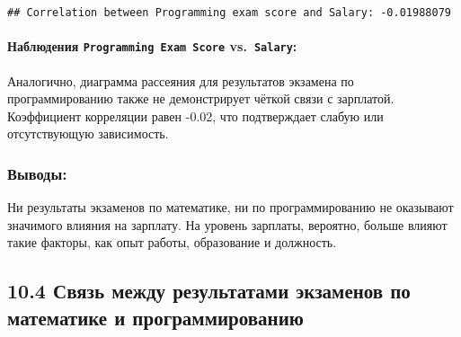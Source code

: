 \documentclass[
]{article}
\newenvironment{Shaded}{\begin{snugshade}}{\end{snugshade}}
\newcommand{\AttributeTok}[1]{\textcolor[rgb]{0.13,0.29,0.53}{#1}}
\newcommand{\CommentTok}[1]{\textcolor[rgb]{0.56,0.35,0.01}{\textit{#1}}}
\newcommand{\FunctionTok}[1]{\textcolor[rgb]{0.13,0.29,0.53}{\textbf{#1}}}
\newcommand{\NormalTok}[1]{#1}
\newcommand{\OtherTok}[1]{\textcolor[rgb]{0.56,0.35,0.01}{#1}}
\newcommand{\SpecialCharTok}[1]{\textcolor[rgb]{0.81,0.36,0.00}{\textbf{#1}}}
\newcommand{\StringTok}[1]{\textcolor[rgb]{0.31,0.60,0.02}{#1}}
\begin{document}
\begin{Shaded}
\end{Shaded}

\begin{verbatim}
## Correlation between Programming exam score and Salary: -0.01988079
\end{verbatim}

\paragraph{\texorpdfstring{Наблюдения \texttt{Programming\ Exam\ Score}
vs.~\texttt{Salary}:}{Наблюдения Programming Exam Score vs.~Salary:}}\label{ux43dux430ux431ux43bux44eux434ux435ux43dux438ux44f-programming-exam-score-vs.-salary}

Аналогично, диаграмма рассеяния для результатов экзамена по
программированию также не демонстрирует чёткой связи с зарплатой.
Коэффициент корреляции равен -0.02, что подтверждает слабую или
отсутствующую зависимость.

\subsubsection{Выводы:}\label{ux432ux44bux432ux43eux434ux44b}

Ни результаты экзаменов по математике, ни по программированию не
оказывают значимого влияния на зарплату. На уровень зарплаты, вероятно,
больше влияют такие факторы, как опыт работы, образование и должность.

\subsection{10.4 Связь между результатами экзаменов по математике и
программированию}\label{ux441ux432ux44fux437ux44c-ux43cux435ux436ux434ux443-ux440ux435ux437ux443ux43bux44cux442ux430ux442ux430ux43cux438-ux44dux43aux437ux430ux43cux435ux43dux43eux432-ux43fux43e-ux43cux430ux442ux435ux43cux430ux442ux438ux43aux435-ux438-ux43fux440ux43eux433ux440ux430ux43cux43cux438ux440ux43eux432ux430ux43dux438ux44e}
\end{document}
